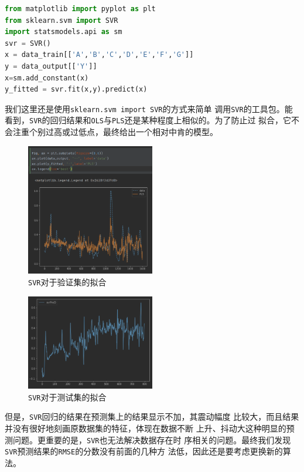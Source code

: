 \documentclass[11pt,a4paper]{elegantpaper}
\begin{document}
\begin{multicols}{2}
\begin{lstlisting}[language=Python]
from matplotlib import pyplot as plt
from sklearn.svm import SVR
import statsmodels.api as sm
svr = SVR()
x = data_train[['A','B','C','D','E','F','G']]
y = data_output[['Y']]
x=sm.add_constant(x)
y_fitted = svr.fit(x,y).predict(x)
\end{lstlisting}

我们这里还是使用\lstinline{sklearn.svm import SVR}的方式来简单
调用\lstinline{SVR}的工具包。能看到，\lstinline{SVR}的回归结果和\lstinline{OLS}与\lstinline{PLS}还是某种程度上相似的。为了防止过
拟合，它不会注重个别过高或过低点，最终给出一个相对中肯的模型。

\begin{figure}[H]
  \centering
  \includegraphics[width=0.5\textwidth]{images/RRR.png}
  \caption{\lstinline{SVR}对于验证集的拟合} 
\end{figure}

\begin{figure}[H]
  \centering
  \includegraphics[width=0.5\textwidth]{images/RR.png}
  \caption{\lstinline{SVR}对于测试集的拟合} 
\end{figure}

但是，\lstinline{SVR}回归的结果在预测集上的结果显示不加，其震动幅度
比较大，而且结果并没有很好地刻画原数据集的特征，体现在数据不断
上升、抖动大这种明显的预测问题。更重要的是，\lstinline{SVR}也无法解决数据存在时
序相关的问题。最终我们发现\lstinline{SVR}预测结果的\lstinline{RMSE}的分数没有前面的几种方
法低，因此还是要考虑更换新的算法。


\end{multicols}
\end{document}
